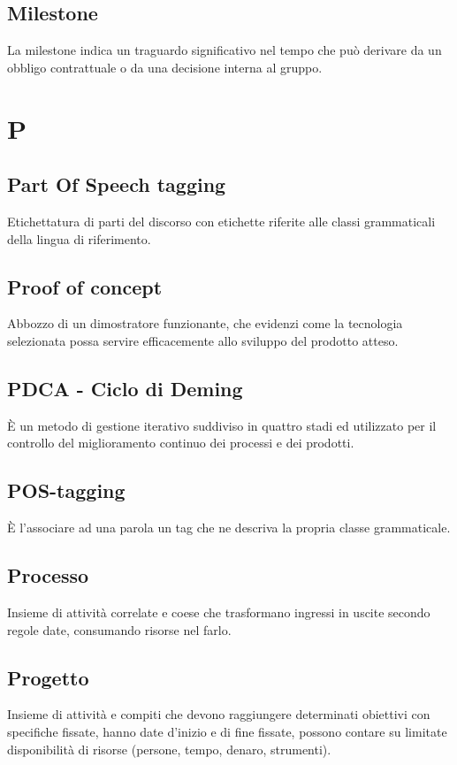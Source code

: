 {	\subsection{Milestone} 
	La milestone indica un traguardo significativo nel tempo che può derivare da un obbligo contrattuale o da una decisione interna al gruppo.
	
	\section{P}
	\subsection{Part Of Speech tagging}
	Etichettatura di parti del discorso con etichette riferite alle classi grammaticali della lingua di riferimento.
	
	\subsection{Proof of concept}
	Abbozzo di un dimostratore funzionante, che evidenzi come la tecnologia selezionata possa servire efficacemente allo sviluppo del prodotto atteso.
	
	\subsection{PDCA - Ciclo di Deming}
	\`E un metodo di gestione iterativo suddiviso in quattro stadi ed utilizzato per il controllo del miglioramento continuo dei processi e dei prodotti.
	
	\subsection{POS-tagging}
	\`E l'associare ad una parola un tag che ne descriva la propria classe grammaticale.
	
	\subsection{Processo} 
	Insieme di attività correlate e coese che trasformano ingressi in uscite secondo regole date, consumando risorse nel farlo.
	
	\subsection{Progetto} 
	Insieme di attività e compiti che devono raggiungere determinati obiettivi con specifiche fissate, hanno date d'inizio e di fine fissate, possono contare su limitate disponibilità di risorse (persone, tempo, denaro, strumenti).
	
}
